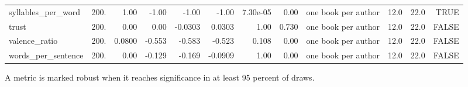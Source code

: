 \begin{table}[htbp]
\begin{tabular}{lrrrrrrrrrrr}
syllables\_per\_word & 200. & 1.00 & -1.00 & -1.00 & -1.00 & 7.30e-05 & 0.00 & one book per author & 12.0 & 22.0 & TRUE \\
trust & 200. & 0.00 & 0.00 & -0.0303 & 0.0303 & 1.00 & 0.730 & one book per author & 12.0 & 22.0 & FALSE \\
valence\_ratio & 200. & 0.0800 & -0.553 & -0.583 & -0.523 & 0.108 & 0.00 & one book per author & 12.0 & 22.0 & FALSE \\
words\_per\_sentence & 200. & 0.00 & -0.129 & -0.169 & -0.0909 & 1.00 & 0.00 & one book per author & 12.0 & 22.0 & FALSE \\
\bottomrule
\end{tabular}
\vspace{0.5em}
\begin{minipage}{\linewidth}\footnotesize A metric is marked robust when it reaches significance in at least 95 percent of draws.\end{minipage}
\end{table}

